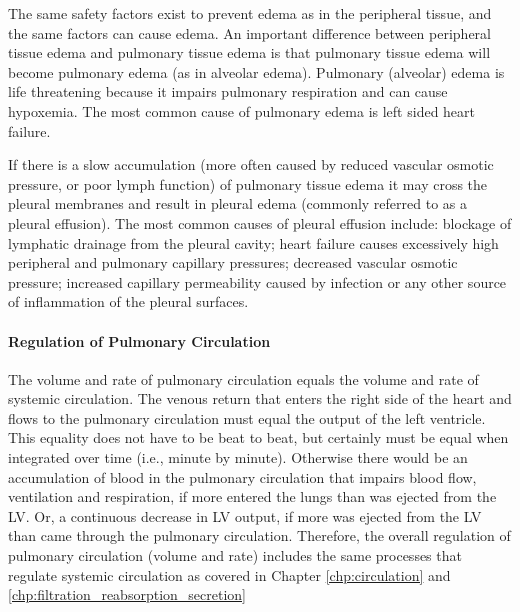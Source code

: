 The same safety factors exist to prevent edema as in the peripheral tissue, and the same factors can cause edema. An important difference between peripheral tissue edema and pulmonary tissue edema is that pulmonary tissue edema will become pulmonary edema (as in alveolar edema). Pulmonary (alveolar) edema is life threatening because it impairs pulmonary respiration and can cause hypoxemia. The most common cause of pulmonary edema is left sided heart failure. 

If there is a slow accumulation (more often caused by reduced vascular osmotic pressure, or poor lymph function) of pulmonary tissue edema it may cross the pleural membranes and result in pleural edema (commonly referred to as a pleural effusion). The most common causes of pleural effusion include: blockage of lymphatic drainage from the pleural cavity; heart failure causes excessively high peripheral and pulmonary capillary pressures;  decreased vascular osmotic pressure; increased capillary permeability caused by infection or any other source of inflammation of the pleural surfaces.

\paragraph{Regulation of Pulmonary Circulation}

The volume and rate of pulmonary circulation equals the volume and rate of systemic circulation. The venous return that enters the right side of the heart and flows to the pulmonary circulation must equal the output of the left ventricle. This equality does not have to be beat to beat, but certainly must be equal when integrated over time (i.e., minute by minute). Otherwise there would be an accumulation of blood in the pulmonary circulation that impairs blood flow, ventilation and respiration, if more entered the lungs than was ejected from the LV. Or, a continuous decrease in LV output, if more was ejected from the LV than came through the pulmonary circulation. Therefore, the overall regulation of pulmonary circulation (volume and rate) includes the same processes that regulate systemic circulation as covered in Chapter \ref{chp:circulation} and \ref{chp:filtration_reabsorption_secretion}

